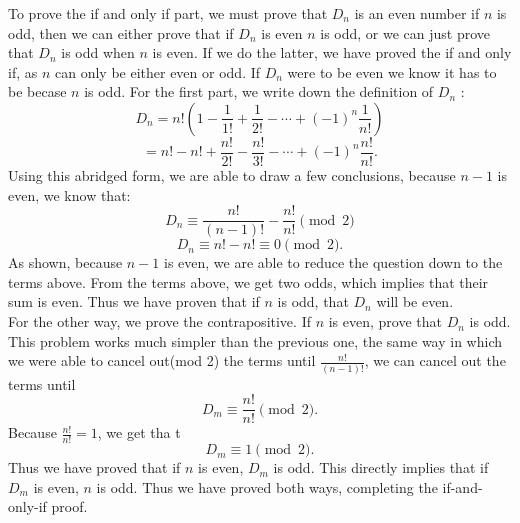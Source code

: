 \documentclass[12pt]{article}
\begin{document}
\noindent
To prove the if and only if part, we must prove that $D_n$ is an even number if $n$ is odd,
then we can either prove that if $D_n$ is even $n$ is odd, or we can just prove that $D_n$ 
is odd when $n$ is even. If we do the latter, we have proved the if and only if, as $n$ can
only be either even or odd. If $D_n$ were to be even we know it has to be becase $n$ is odd.
For the first part, we write down the definition of $D_n$ :
\[
D_n = n!(1 - \frac{1}{1!} + \frac{1}{2!} - \cdots + (-1)^{n}\frac{1}{n!})
\] 
\[
	= n! - n! + \frac{n!}{2!} - \frac{n!}{3!} - \cdots + (-1)^{n}\frac{n!}{n!} 
.\] 
Using this abridged form, we are able to draw a few conclusions, because $n-1$ is even, we
know that:
 \[
	 D_n \equiv \frac{n!}{(n-1)!} - \frac{n!}{n!} \pmod{2}
 \]
  \[
	  D_n \equiv n! - n! \equiv 0 \pmod{2}
 .\]
As shown, because $n-1$ is even, we are able to reduce the question down to the terms above.
From the terms above, we get two odds, which implies that their sum is even. Thus we have proven
that if $n$ is odd, that $D_n$ will be even.  \\

\noindent
For the other way, we prove the contrapositive. If $n$ is even, prove that $D_n$ is odd.
This problem works much simpler than the previous one, the same way in which we were able to
cancel out(mod 2) the terms until $\frac{n!}{(n-1)!}$, we can cancel out the terms until
\[
	D_m \equiv \frac{n!}{n!} \pmod{2}
.\] 
Because $\frac{n!}{n!} = 1$, we get tha t
 \[
	 D_m \equiv 1 \pmod{2}
.\] 
Thus we have proved that if $n$ is even, $D_m$ is odd. This directly implies that if $D_m$ is even,
$n$ is odd. Thus we have proved both ways, completing the if-and-only-if proof.
\end{document}
